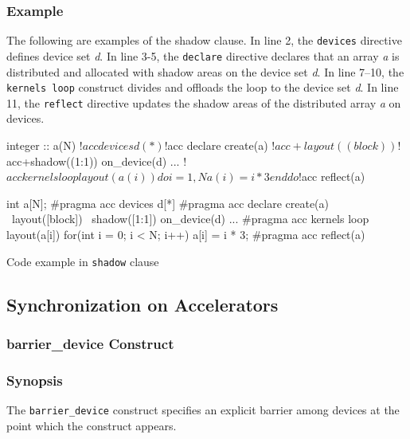 \subsubsection*{Example}
The following are examples of the shadow clause.
In line 2, the {\tt devices} directive defines device set {\it d}.
In line 3-5, the {\tt declare} directive declares that an array {\it a} is distributed and allocated with shadow areas on the device set {\it d}.
In line 7--10, the {\tt kernels loop} construct divides and offloads the loop to the device set {\it d}.
In line 11, the {\tt reflect} directive updates the shadow areas of the distributed array {\it a} on devices.
%
\begin{myfigure}
\begin{minipage}{0.47\hsize}
\begin{center}
\begin{XACCFexampleL}
integer :: a(N)
!$acc devices d(*)
!$acc declare create(a)
!$acc+layout((block))
!$acc+shadow((1:1)) on_device(d)
...
!$acc kernels loop layout(a(i))
do i = 1, N
  a(i) = i * 3
end do
!$acc reflect(a)
\end{XACCFexampleL}
\end{center}
\end{minipage}
%
\begin{minipage}{0.48\hsize}
\begin{center}
\begin{XACCCexampleR}
int a[N];
#pragma acc devices d[*]
#pragma acc declare create(a) \
        layout([block]) \
        shadow([1:1]) on_device(d)
...
#pragma acc kernels loop layout(a[i])
for(int i = 0; i < N; i++){
  a[i] = i * 3;
}
#pragma acc reflect(a)
\end{XACCCexampleR}
\end{center}
\end{minipage}
\caption{Code example in {\XACC} {\tt shadow} clause}\label{code:shadow_clause}
\end{myfigure}


\subsection{Synchronization on Accelerators}
\subsubsection{barrier\_device Construct}
\subsubsection*{Synopsis}
The {\tt barrier\_device} construct specifies an explicit barrier among devices at the point which the construct appears.

